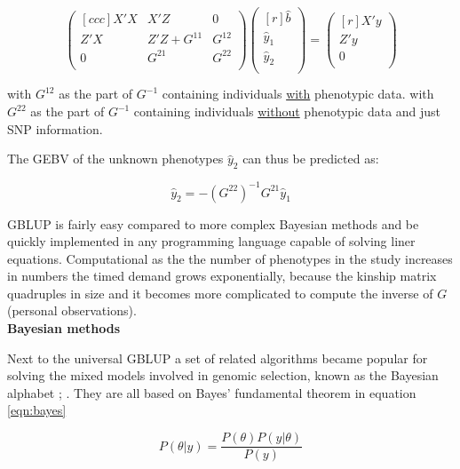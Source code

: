 \begin{equation}
 \begin{pmatrix}[ccc]
  X'X & X'Z & 0 \\ 
  Z'X & Z'Z + G^{11} & G^{12} \\ 
  0 & G^{21} & G^{22} \\ 
 \end{pmatrix}
 \begin{pmatrix}[r]
  \hat{b} \\ 
  \hat{y}_1 \\ 
  \hat{y}_2 \\ 
 \end{pmatrix}
 =
 \begin{pmatrix}[r]
  X'y \\ 
  Z'y \\ 
  0 \\ 
 \end{pmatrix}
 \label{eqn:pBLUP}
\end{equation}

with $G^{12}$ as the part of $G^{-1}$ containing individuals \underline{with} phenotypic data.
with $G^{22}$ as the part of $G^{-1}$ containing individuals \underline{without} phenotypic data and just SNP information. 

The GEBV of the unknown phenotypes $\hat{y}_2$ can thus be predicted as:

\begin{equation}
\hat{y}_2 = -\left( G^{22}\right)^{-1}G^{21}\hat{y}_1
\label{eqn:gpred}
\end{equation}

GBLUP is fairly easy compared to more complex Bayesian methods and be quickly implemented in any programming
language capable of solving liner equations. Computational as the the number of phenotypes in the study
increases in numbers the timed demand grows exponentially, because the kinship matrix quadruples in size and
it becomes more complicated to compute the inverse of $G$ (personal observations). \\

\textbf{Bayesian methods} \newline 

Next to the universal GBLUP a set of related algorithms became popular for solving the mixed models involved in genomic selection, known as the Bayesian alphabet \cite{gianola2009}; \cite{gianola2013}. They are all based on Bayes' fundamental theorem in equation \ref{eqn:bayes}

\begin{equation}
P(\theta | y) = \frac{P(\theta )P(y | \theta)}{P(y)} 
\label{eqn:bayes}
\end{equation}

